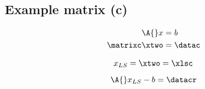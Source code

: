 \subsection{Example matrix (c)}
\begin{equation}
  \begin{split}
    \A{} x &= b \\
    \matrixc \xtwo &= \datac
  \end{split}
\end{equation}
	
\begin{equation}
  x_{LS} = \xtwo = \xlsc
\end{equation}

\begin{equation}
  \A{}x_{LS} - b = \datacr
\end{equation}


\endinput
